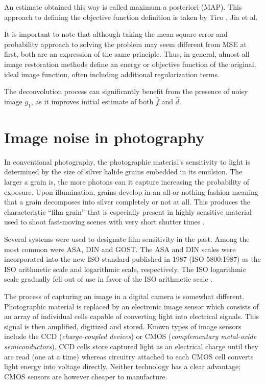 \documentclass[12pt,notitlepage]{report}
\begin{document}
An estimate obtained this way is called maximum a posteriori (MAP). This approach to defining the objective function definition is taken by Tico \cite{tico06} \cite{tico07}, Jia et al. \cite{jia04}


It is important to note that although taking the mean square error and probability approach to solving the problem may seem different from MSE at first, both are an expression of the same principle. Thus, in general, almost all image restoration methods define an energy or objective function of the original, ideal image function, often including additional regularization terms. 



The deconvolution process can significantly benefit from the presence of noisy image $g_1$, as it improves initial estimate of both $\hat{f}$ and $\hat{d}$.   


\section{Image noise in photography}
\label{sec:image_noise_in_photography}

In conventional photography, the photographic material’s sensitivity to light is determined by the size of silver halide grains embedded in its emulsion. The larger a grain is, the more photons can it capture increasing the probability of exposure. Upon illumination, grains develop in an all-or-nothing fashion meaning that a grain decomposes into silver completely or not at all.  This produces the characteristic “film grain” that is especially present in highly sensitive material used to shoot fast-moving scenes with very short shutter times \cite{wiki}. 

Several systems were used to designate film sensitivity in the past. Among the most common were ASA, DIN and GOST. The ASA and DIN scales were incorporated into the new ISO standard published in 1987 (ISO 5800:1987) as the ISO arithmetic scale and logarithmic scale, respectively. The ISO logarithmic scale gradually fell out of use in favor of the ISO arithmetic scale \cite{wiki}.

The process of capturing an image in a digital camera is somewhat different. Photographic material is replaced by an electronic image sensor which consists of an array of individual cells capable of converting light into electrical signals. This signal is then amplified, digitized and stored. Known types of image sensors include the CCD ({\em charge-coupled devices}) or CMOS ({\em complementary metal-oxide semiconductors}). CCD cells store captured light as an electrical charge until they are read (one at a time) whereas circuitry attached to each CMOS cell converts light energy into voltage directly. Neither technology has a clear advantage; CMOS sensors are however cheaper to manufacture.
\end{document}
